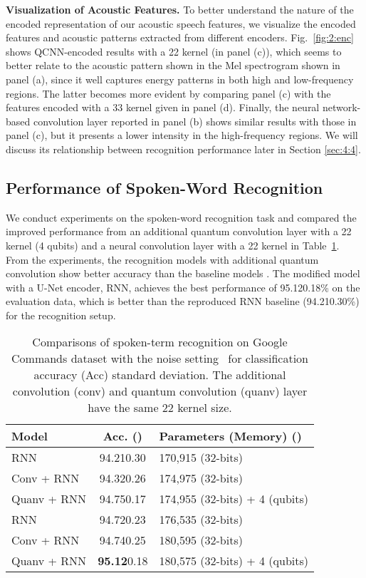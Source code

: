 \documentclass{article}
\begin{document}
\textbf{Visualization of Acoustic Features.} To better understand the nature of the encoded representation of our acoustic speech features, we visualize the encoded features and acoustic patterns extracted from different encoders. Fig.~\ref{fig:2:enc} shows QCNN-encoded results with a 22 kernel (in panel (c)), which seems to better relate to the acoustic pattern shown in the Mel spectrogram shown in panel (a), since it well captures energy patterns in both high and low-frequency regions. The latter becomes more evident by comparing panel (c) with the features encoded with a 33 kernel given in panel (d). Finally, the neural network-based convolution layer reported in panel (b) shows similar results with those in panel (c), but it presents a lower intensity in the high-frequency  regions. We will discuss its relationship between recognition performance later in Section \ref{sec:4:4}.



\subsection{Performance of Spoken-Word Recognition}
We conduct experiments on the spoken-word recognition task and compared the improved performance from an additional quantum convolution layer with a 22 kernel (4 qubits) and a neural convolution layer with a 22 kernel in Table~\ref{tab:1:acc}. From the experiments, the recognition models with additional quantum convolution show better accuracy than the baseline models \cite{de2018neural}. The modified model with a U-Net encoder, RNN, achieves the best performance 
of 95.120.18\% on the evaluation data, which is better than 
the reproduced RNN baseline (94.210.30\%) for the recognition setup. 



\begin{table}[ht!]
\centering
\caption{Comparisons of spoken-term recognition on Google Commands dataset with the noise setting~\cite{warden2018speech} for classification accuracy (Acc)  standard deviation. The additional convolution (conv) and quantum convolution (quanv) layer have the same 22 kernel size.}
\label{tab:1:acc}
\begin{adjustbox}{width=0.48\textwidth}
\begin{tabular}{|l|c|l|}
\hline
Model & Acc. () & Parameters (Memory) () \\ \hline
RNN~\cite{de2018neural} & 94.210.30 & 170,915 (32-bits) \\
Conv + RNN& 94.320.26 & 174,975 (32-bits) \\
Quanv + RNN & 94.750.17 & 174,955 (32-bits) + 4 (qubits) \\ \hline
RNN & 94.720.23 & 176,535 (32-bits) \\
Conv + RNN & 94.740.25 & 180,595 (32-bits) \\
Quanv + RNN & \textbf{95.12}0.18 & 180,575 (32-bits) + 4 (qubits) \\ \hline
\end{tabular}
\end{adjustbox}
\vspace{-4mm}
\end{table}
\end{document}
